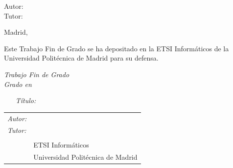 \begin{titlepage}
\vspace*{0.5cm}
\begin{center}
\huge\bfseries {  \TituloTFG{} } 
\end{center}

\vspace*{5cm}

\noindent
\large{Autor: \NombreAutor{} }\\
\large{Tutor: \NombreTutor{} }


\vspace*{4cm}
\begin{center}
Madrid, \Fecha
\end{center}

\newpage
\thispagestyle{empty}
\noindent
Este Trabajo Fin de Grado se ha depositado en la ETSI Informáticos de la Universidad Politécnica de Madrid para su defensa.

\vspace*{4cm}
\noindent
\textit{Trabajo Fin de Grado}\\
\textit{Grado en} \Grado{}

\begin{enumerate}
\item[\textit{Título:}] \TituloTFG{}
\end{enumerate}
\Fecha


\vspace*{3cm}

\noindent
\begin{tabular}{ll}
\textit{Autor:} & \NombreAutor{}  \\ 
\textit{Tutor:} & \NombreTutor{}  \\ 
                & \Departamento{} \\
                & ETSI Informáticos\\
                & Universidad Politécnica de Madrid
\end{tabular} 

\end{titlepage}
